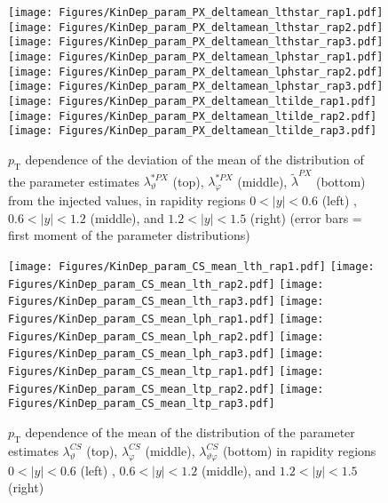 \documentclass[12pt]{article}
\newcommand{\pT}{p_\mathrm{T}}
\newcommand{\absy}{\left |  y \right |}
\newcommand{\lamthCS}{\lambda^{\scriptscriptstyle CS}_\vartheta}
\newcommand{\lamphCS}{\lambda^{\scriptscriptstyle CS}_\varphi}
\newcommand{\lamthphCS}{\lambda^{\scriptscriptstyle CS}_{\vartheta \varphi}}
\newcommand{\lamtildePX}{\tilde{\lambda}^{\scriptscriptstyle PX}}
\newcommand{\lamthstarPX}{\lambda^{* \scriptscriptstyle PX}_\vartheta}
\newcommand{\lamphstarPX}{\lambda^{* \scriptscriptstyle PX}_\varphi}
\begin{document}
\begin{figure}[htbp]
\centering
\texttt{[image: Figures/KinDep\_param\_PX\_deltamean\_lthstar\_rap1.pdf]}
\texttt{[image: Figures/KinDep\_param\_PX\_deltamean\_lthstar\_rap2.pdf]}
\texttt{[image: Figures/KinDep\_param\_PX\_deltamean\_lthstar\_rap3.pdf]}
\texttt{[image: Figures/KinDep\_param\_PX\_deltamean\_lphstar\_rap1.pdf]}
\texttt{[image: Figures/KinDep\_param\_PX\_deltamean\_lphstar\_rap2.pdf]}
\texttt{[image: Figures/KinDep\_param\_PX\_deltamean\_lphstar\_rap3.pdf]}
\texttt{[image: Figures/KinDep\_param\_PX\_deltamean\_ltilde\_rap1.pdf]}
\texttt{[image: Figures/KinDep\_param\_PX\_deltamean\_ltilde\_rap2.pdf]}
\texttt{[image: Figures/KinDep\_param\_PX\_deltamean\_ltilde\_rap3.pdf]}
\caption{$\pT$ dependence of the deviation of the mean of the distribution of
the parameter estimates $\lamthstarPX$ (top), $\lamphstarPX$ (middle),
$\lamtildePX$ (bottom) from the injected values, in rapidity regions
$0<\absy<0.6$ (left) , $0.6<\absy<1.2$ (middle), and $1.2<\absy<1.5$ (right) (error bars = first moment of
the parameter distributions)}
\end{figure}
\clearpage










\begin{figure}[htbp]
\centering
\texttt{[image: Figures/KinDep\_param\_CS\_mean\_lth\_rap1.pdf]}
\texttt{[image: Figures/KinDep\_param\_CS\_mean\_lth\_rap2.pdf]}
\texttt{[image: Figures/KinDep\_param\_CS\_mean\_lth\_rap3.pdf]}
\texttt{[image: Figures/KinDep\_param\_CS\_mean\_lph\_rap1.pdf]}
\texttt{[image: Figures/KinDep\_param\_CS\_mean\_lph\_rap2.pdf]}
\texttt{[image: Figures/KinDep\_param\_CS\_mean\_lph\_rap3.pdf]}
\texttt{[image: Figures/KinDep\_param\_CS\_mean\_ltp\_rap1.pdf]}
\texttt{[image: Figures/KinDep\_param\_CS\_mean\_ltp\_rap2.pdf]}
\texttt{[image: Figures/KinDep\_param\_CS\_mean\_ltp\_rap3.pdf]}
\caption{$\pT$ dependence of the mean of the distribution of the parameter estimates $\lamthCS$ (top), $\lamphCS$ (middle), $\lamthphCS$ (bottom) in rapidity regions $0<\absy<0.6$ (left) , $0.6<\absy<1.2$ (middle), and $1.2<\absy<1.5$ (right)}
\end{figure}
\clearpage
\end{document}
